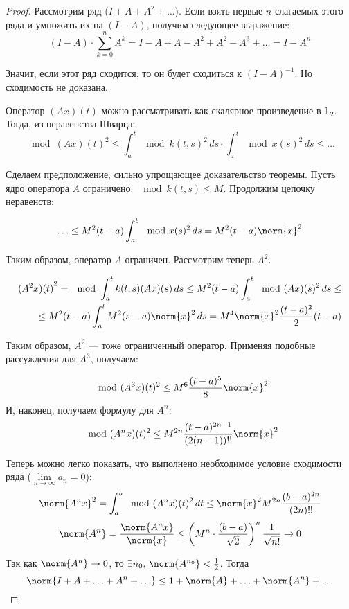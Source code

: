 	\begin{proof}
		Рассмотрим ряд ($I + A + A^2 + \ldots$). Если взять первые $n$ слагаемых этого ряда и умножить их на $(I - A)$, 
		получим следующее выражение:
		$$(I-A) \cdot \sum_{k=0}^n A^k = I - A + A - A^2 + A^2 - A^3 \pm\ldots = I - A^n$$
		
		Значит, если этот ряд сходится, то он будет сходиться к $(I - A)^{-1}$. Но сходимость не доказана.
		
		Оператор $(Ax)(t)$ можно рассматривать как скалярное произведение в $\mathbb{L}_2$. Тогда, из неравенства Шварца:
		$$\mod{(Ax)(t)}^2 \leq 
		  \int_a^t \mod{k(t,s)}^2 \,ds \cdot \int_a^t \mod{x(s)}^2 \,ds \leq \ldots$$
		  
		Сделаем предположение, сильно упрощающее доказательство теоремы. Пусть ядро оператора $A$ 
		ограничено: $\mod{k(t,s)} \leq M$. Продолжим цепочку неравенств:
		
		$$\ldots \leq M^2(t-a) \int_a^b \mod{x(s)}^2 \,ds = M^2(t-a)\norm{x}^2$$
		
		Таким образом, оператор $A$ ограничен. Рассмотрим теперь $A^2$.
		
		\begin{align*}
			{(A^2x)(t)}^2 = \mod{\int_a^t k(t,s)(Ax)(s) \,ds} \leq M^2(t-a)\int_a^t\mod{(Ax)(s)}^2\,ds \leq \\ 
			\leq M^2(t-a)\int_a^tM^2(s-a)\norm{x}^2 \,ds = M^4 \norm{x}^2 \frac{(t-a)^2}{2}(t-a)
		\end{align*}
		
		Таким образом, $A^2$ --- тоже ограниченный оператор. Применяя подобные рассуждения для $A^3$, получаем:
		
		$$\mod{(A^3x)(t)}^2 \leq M^6 \frac{(t-a)^5}{8}\norm{x}^2 $$
		И, наконец, получаем формулу для $A^n$:
		$$\mod{(A^nx)(t)}^2 \leq M^{2n} \frac{(t-a)^{2n-1}}{(2(n-1))!!}\norm{x}^2 $$
		
		Теперь можно легко показать, что выполнено необходимое условие сходимости ряда 
		($\underset{n\rightarrow\infty}{\lim} a_n = 0$):
		$$\norm{A^nx}^2 = \int_a^b \mod{(A^nx)(t)}^2 \,dt \leq \norm{x}^2 M^{2n} \frac{(b-a)^{2n}}{(2n)!!}$$
		$$\norm{A^n} = \frac{\norm{A^nx}}{\norm{x}} \leq 
		  \left( M^n\cdot\frac{(b-a)}{\sqrt{2}}\right)^n \frac{1}{\sqrt{n!}} \rightarrow 0$$
		  
		Так как $\norm{A^n} \rightarrow 0$, то $\exists n_0,\,\norm{A^{n_0}} < \frac{1}{2}$. Тогда
		$$\norm{I + A + \ldots + A^n + \ldots} \leq 1 + \norm{A} + \ldots + \norm{A^n} + \ldots$$
		

\end{proof}
